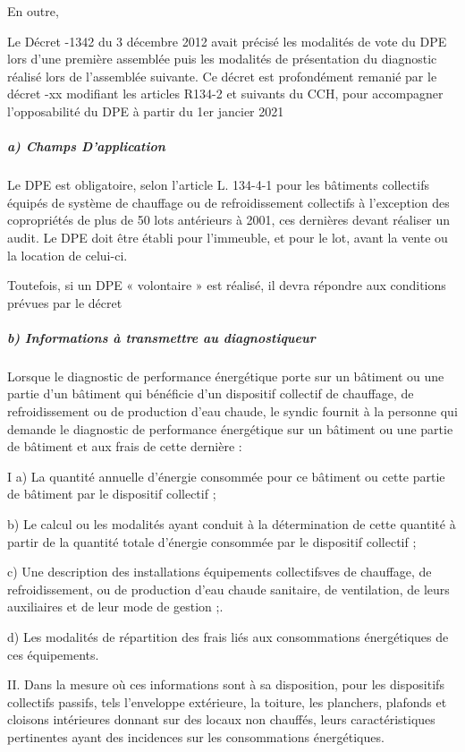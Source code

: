 			En outre,
			
			Le Décret -1342 du 3 décembre 2012 avait précisé les modalités de vote du DPE lors d’une première assemblée puis les modalités de présentation du diagnostic réalisé lors de l’assemblée suivante. Ce décret est profondément remanié par le décret -xx modifiant les articles R134-2 et suivants du CCH, pour accompagner l’opposabilité du DPE à partir du 1er jancier 2021
			
			\subparagraph{a) Champs D’application}
			
				Le DPE est obligatoire, selon l’article L. 134-4-1 pour les bâtiments collectifs équipés de système de chauffage ou de refroidissement collectifs à l’exception des copropriétés de plus de 50 lots antérieurs à 2001, ces dernières devant réaliser un audit. Le DPE doit être établi pour l’immeuble, et pour le lot, avant la vente ou la location de celui-ci.
				
				Toutefois, si un DPE « volontaire » est réalisé, il devra répondre aux conditions prévues par le décret
			
			\subparagraph{b) Informations à transmettre au diagnostiqueur}
			
				Lorsque le diagnostic de performance énergétique porte sur un bâtiment ou une partie d'un bâtiment qui bénéficie d'un dispositif collectif de chauffage, de refroidissement ou de production d'eau chaude, le syndic fournit à la personne qui demande le diagnostic de performance énergétique sur un bâtiment ou une partie de bâtiment et aux frais de cette dernière :
				
				I a) La quantité annuelle d'énergie consommée pour ce bâtiment ou cette partie de bâtiment par le dispositif collectif ;
				
				b) Le calcul ou les modalités ayant conduit à la détermination de cette quantité à partir de la quantité totale d'énergie consommée par le dispositif collectif ;
				
				c) Une description des installations équipements collectifsves de chauffage, de refroidissement, ou de production d'eau chaude sanitaire, de ventilation, de leurs auxiliaires et de leur mode de gestion ;.
				
				d) Les modalités de répartition des frais liés aux consommations énergétiques de ces équipements.
				
				II. Dans la mesure où ces informations sont à sa disposition, pour les dispositifs collectifs passifs, tels l’enveloppe extérieure, la toiture, les planchers, plafonds et cloisons intérieures donnant sur des locaux non chauffés, leurs caractéristiques pertinentes ayant des incidences sur les consommations énergétiques.
			
